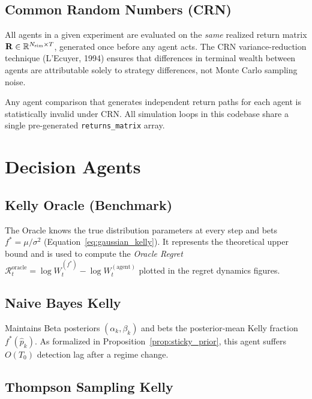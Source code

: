 \subsection{Common Random Numbers (CRN)}
\label{sec:crn}

All agents in a given experiment are evaluated on the \emph{same} realized
return matrix $\mathbf{R} \in \mathbb{R}^{N_{\text{sim}}\times T}$, generated once
before any agent acts.  The CRN variance-reduction technique (L'Ecuyer, 1994)
ensures that differences in terminal wealth between agents are attributable
solely to strategy differences, not Monte Carlo sampling noise.

\begin{remark}
Any agent comparison that generates independent return paths for each agent
is statistically invalid under CRN.  All simulation loops in this codebase
share a single pre-generated \texttt{returns\_matrix} array.
\end{remark}

\section{Decision Agents}
\label{sec:agents}

\subsection{Kelly Oracle (Benchmark)}

The Oracle knows the true distribution parameters at every step and bets
$f^* = \mu/\sigma^2$ (Equation~\eqref{eq:gaussian_kelly}).  It represents the
theoretical upper bound and is used to compute the \emph{Oracle Regret}
$\mathcal{R}_t^{\text{oracle}} = \log W_t^{(f^*)} - \log W_t^{(\text{agent})}$
plotted in the regret dynamics figures.

\subsection{Naive Bayes Kelly}

Maintains Beta posteriors $(\alpha_k,\beta_k)$ and bets the posterior-mean
Kelly fraction $f^*(\hat p_k)$.  As formalized in
Proposition~\ref{prop:sticky_prior}, this agent suffers $O(T_0)$ detection lag
after a regime change.

\subsection{Thompson Sampling Kelly}

